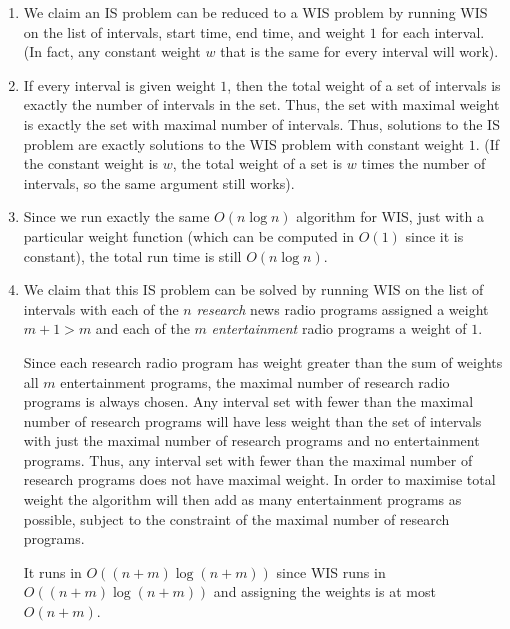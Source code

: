 \documentclass[12 pt, letterpaper]{hmcpset}
\begin{document}
\begin{solution}
	\begin{enumerate}
		\item We claim an IS problem can be reduced to a WIS problem by running WIS on the list of intervals, start time, end time, and weight $1$ for each interval. (In fact, any constant weight $w$ that is the same for every interval will work).

		\item If every interval is given weight $1$, then the total weight of a set of intervals is exactly the number of intervals in the set. Thus, the set with maximal weight is exactly the set with maximal number of intervals. Thus, solutions to the IS problem are exactly solutions to the WIS problem with constant weight $1$. (If the constant weight is $w$, the total weight of a set is $w$ times the number of intervals, so the same argument still works).

		\item Since we run exactly the same $O(n \log n)$ algorithm for WIS, just with a particular weight function (which can be computed in $O(1)$ since it is constant), the total run time is still $O(n \log n)$.

		\item We claim that this IS problem can be solved by running WIS on the list of intervals with each of the $n$ \emph{research} news radio programs assigned a weight $m + 1 > m$ and each of the $m$ \emph{entertainment} radio programs a weight of $1$. 

			Since each research radio program has weight greater than the sum of weights all $m$ entertainment programs, the maximal number of research radio programs is always chosen. Any interval set with fewer than the maximal number of research programs will have less weight than the set of intervals with just the maximal number of research programs and no entertainment programs. Thus, any interval set with fewer than the maximal number of research programs does not have maximal weight. In order to maximise total weight the algorithm will then add as many entertainment programs as possible, subject to the constraint of the maximal number of research programs.

			It runs in $O((n + m) \log (n + m))$ since WIS runs in $O((n + m) \log (n + m))$ and assigning the weights is at most $O(n + m)$.
	\end{enumerate}
\end{solution}

\pagebreak
\end{document}
